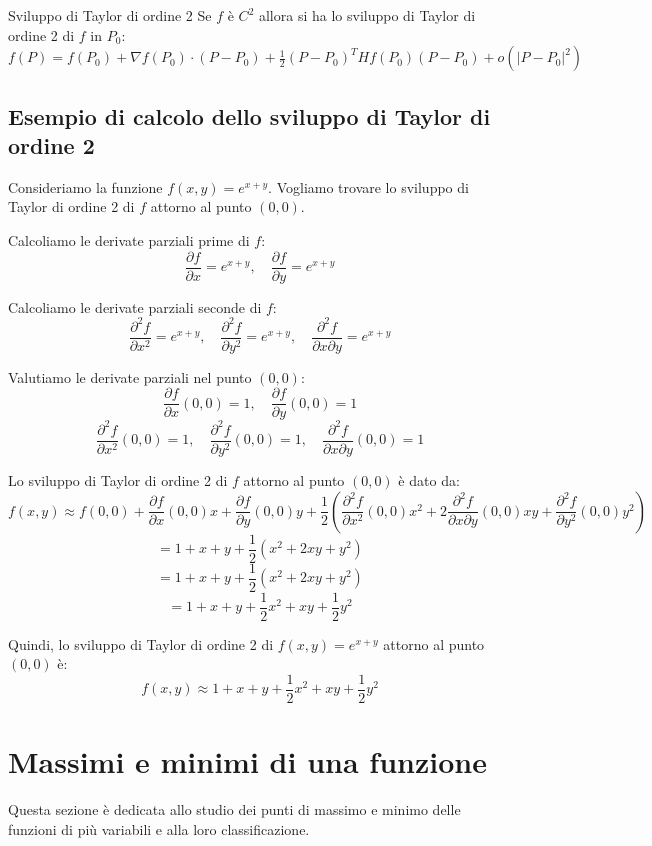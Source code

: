 \begin{teorema}{Sviluppo di Taylor di ordine 2}
  Se $f$ è $C^2$ allora si ha lo sviluppo di Taylor di ordine 2 di $f$ in $P_0$:
  $f(P) = f(P_0) + \nabla f(P_0) \cdot (P - P_0) + \frac{1}{2} (P - P_0)^T Hf(P_0) (P - P_0) + o(|P - P_0|^2)$
\end{teorema}

\subsection{Esempio di calcolo dello sviluppo di Taylor di ordine 2}
Consideriamo la funzione $f(x,y) = e^{x+y}$. Vogliamo trovare lo sviluppo di Taylor di ordine 2 di $f$ attorno al punto $(0,0)$.

Calcoliamo le derivate parziali prime di $f$:
\[
\frac{\partial f}{\partial x} = e^{x+y}, \quad \frac{\partial f}{\partial y} = e^{x+y}
\]

Calcoliamo le derivate parziali seconde di $f$:
\[
\frac{\partial^2 f}{\partial x^2} = e^{x+y}, \quad \frac{\partial^2 f}{\partial y^2} = e^{x+y}, \quad \frac{\partial^2 f}{\partial x \partial y} = e^{x+y}
\]

Valutiamo le derivate parziali nel punto $(0,0)$:
\[
\frac{\partial f}{\partial x}(0,0) = 1, \quad \frac{\partial f}{\partial y}(0,0) = 1
\]
\[
\frac{\partial^2 f}{\partial x^2}(0,0) = 1, \quad \frac{\partial^2 f}{\partial y^2}(0,0) = 1, \quad \frac{\partial^2 f}{\partial x \partial y}(0,0) = 1
\]

Lo sviluppo di Taylor di ordine 2 di $f$ attorno al punto $(0,0)$ è dato da:
\[
f(x,y) \approx f(0,0) + \frac{\partial f}{\partial x}(0,0)x + \frac{\partial f}{\partial y}(0,0)y + \frac{1}{2}\left( \frac{\partial^2 f}{\partial x^2}(0,0)x^2 + 2\frac{\partial^2 f}{\partial x \partial y}(0,0)xy + \frac{\partial^2 f}{\partial y^2}(0,0)y^2 \right)
\]
\[
= 1 + x + y + \frac{1}{2}(x^2 + 2xy + y^2)
\]
\[
= 1 + x + y + \frac{1}{2}(x^2 + 2xy + y^2)
\]
\[
= 1 + x + y + \frac{1}{2}x^2 + xy + \frac{1}{2}y^2
\]

Quindi, lo sviluppo di Taylor di ordine 2 di $f(x,y) = e^{x+y}$ attorno al punto $(0,0)$ è:
\[
f(x,y) \approx 1 + x + y + \frac{1}{2}x^2 + xy + \frac{1}{2}y^2
\]

\section{Massimi e minimi di una funzione}

Questa sezione è dedicata allo studio dei punti di massimo e minimo delle funzioni di più variabili e alla loro classificazione.


